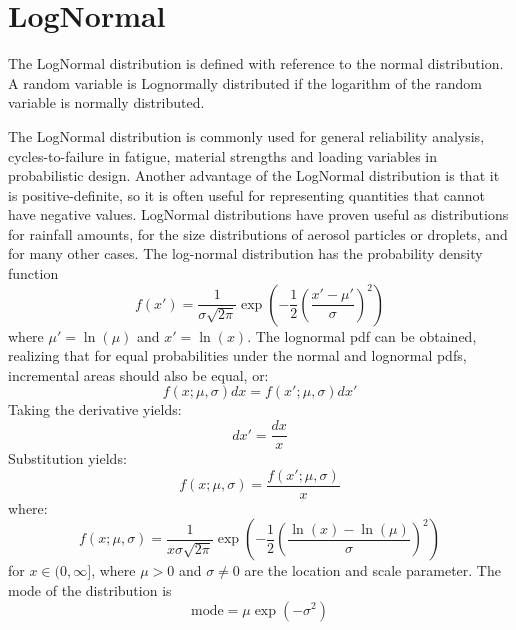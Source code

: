 \clearpage
\section{LogNormal}
\label{sec:LogNormal}
The LogNormal distribution is defined with reference to the normal
distribution. A random variable is Lognormally distributed if the
logarithm of the random variable is normally distributed.

The LogNormal distribution is commonly used for general reliability
analysis, cycles-to-failure in fatigue, material strengths and
loading variables in probabilistic design. Another advantage of the
LogNormal distribution is that it is positive-definite, so it is
often useful for representing quantities that cannot have negative
values. LogNormal distributions have proven useful as distributions
for rainfall amounts, for the size distributions of aerosol
particles or droplets, and for many other cases. The log-normal
distribution has the probability density function
\begin{equation}
f(x') = \frac{1}{\sigma\sqrt{2\pi}} \exp\left(-\frac{1}{2}\left(\frac{x'-\mu'}{\sigma}\right)^2\right)
\end{equation}
where $\mu'= \ln(\mu)$ and  $x'= \ln(x)$.
The lognormal pdf can be obtained, realizing that for equal probabilities
under the normal and lognormal pdfs, incremental areas should also be equal, or:
\begin{equation}%
    f(x;\mu,\sigma)dx =f(x';\mu,\sigma)dx'
\end{equation}
Taking the derivative yields:
\begin{equation}%
    dx' =\frac{dx}{x}
\end{equation}
Substitution yields:
\begin{equation}%
    f(x;\mu,\sigma) =\frac{f(x';\mu,\sigma)}{x}
\end{equation}
where:
\begin{equation}
    f(x;\mu,\sigma) =
        \frac{1}{x\sigma \sqrt{2 \pi}}\exp\left(-\frac{1}{2}\left(\frac{\ln (x) -
        \ln(\mu)}{\sigma}\right)^2\right)
\end{equation}
for $x\in (0,\infty]$, where  $\mu>0$ and $\sigma\neq 0$ are the location and scale
parameter. The mode of the distribution is
\begin{equation}
\mathrm{mode} =   \mu\exp\left(-\sigma^2\right)
\end{equation}

